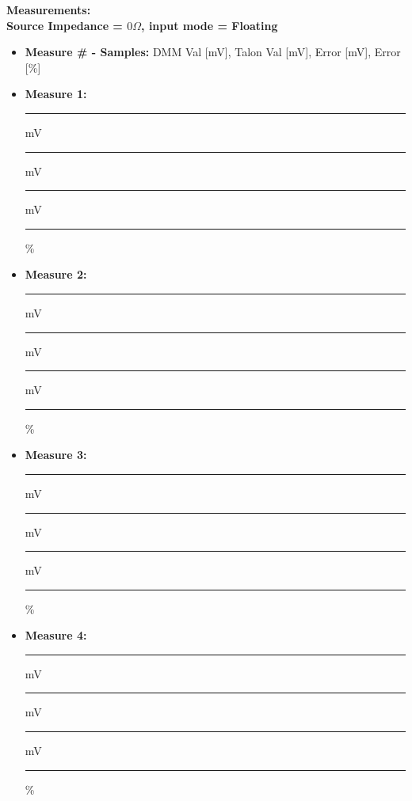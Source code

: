 {\Large \textbf{Measurements:}}\\
\textbf{Source Impedance = $0\Omega$, input mode = Floating}
\begin{itemize}
\item \textbf{Measure \# - Samples:} DMM Val [mV], Talon Val [mV], Error [mV], Error [\%]
\item \textbf{Measure 1:} \rule{1.5cm}{0.15mm} mV \hspace{0.5cm} \rule{1.5cm}{0.15mm} mV \hspace{0.5cm} \rule{1.5cm}{0.15mm} mV \hspace{0.5cm} \rule{1.5cm}{0.15mm} \%
\item \textbf{Measure 2:} \rule{1.5cm}{0.15mm} mV \hspace{0.5cm} \rule{1.5cm}{0.15mm} mV \hspace{0.5cm} \rule{1.5cm}{0.15mm} mV \hspace{0.5cm} \rule{1.5cm}{0.15mm} \%
\item \textbf{Measure 3:} \rule{1.5cm}{0.15mm} mV \hspace{0.5cm} \rule{1.5cm}{0.15mm} mV \hspace{0.5cm} \rule{1.5cm}{0.15mm} mV \hspace{0.5cm} \rule{1.5cm}{0.15mm} \%
\item \textbf{Measure 4:} \rule{1.5cm}{0.15mm} mV \hspace{0.5cm} \rule{1.5cm}{0.15mm} mV \hspace{0.5cm} \rule{1.5cm}{0.15mm} mV \hspace{0.5cm} \rule{1.5cm}{0.15mm} \%
\end{itemize}

